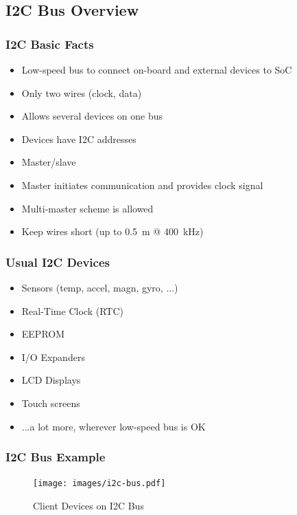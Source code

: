 \documentclass[aspectratio=169,usenames,dvipsnames]{beamer}
\begin{document}

\subsection{I2C Bus Overview}

\begin{frame}
  \frametitle{I2C Basic Facts}
  \begin{itemize}
    \item Low-speed bus to connect on-board and external devices to SoC
    \item Only two wires (clock, data)
    \item Allows several devices on one bus
    \item Devices have I2C addresses
    \item Master/slave
    \item Master initiates communication and provides clock signal
    \item Multi-master scheme is allowed
    \item Keep wires short (up to \SI{0.5}{\m} @ \SI{400}{\kilo\Hz})
  \end{itemize}
\end{frame}

\begin{frame}
  \frametitle{Usual I2C Devices}
  \begin{itemize}
    \item Sensors (temp, accel, magn, gyro, ...)
    \item Real-Time Clock (RTC)
    \item EEPROM
    \item I/O Expanders
    \item LCD Displays
    \item Touch screens
    \item ...a lot more, wherever low-speed bus is OK
  \end{itemize}
\end{frame}

\begin{frame}
  \frametitle{I2C Bus Example}
  \begin{figure}
    \centering
    \texttt{[image: images/i2c-bus.pdf]}
    \caption{Client Devices on I2C Bus}
  \end{figure}
\end{frame}

\end{document}
